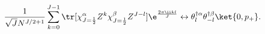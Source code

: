 \begin{equation}
  \frac{1}{\sqrt{J}N^{J/2+1}}\sum_{k=0}^{J-1}\tr
  [\chi^\alpha_{J=\frac{1}{2}}Z^k\chi^\beta_{J=\frac{1}{2}}Z^{J-l}]
  \e^{\frac{2\pi \ii kl}{J}}\leftrightarrow
  \theta^{\dag\alpha}_l\theta^{\dag\beta}_{-l}
  \ket{0,p_+}.
\end{equation}


